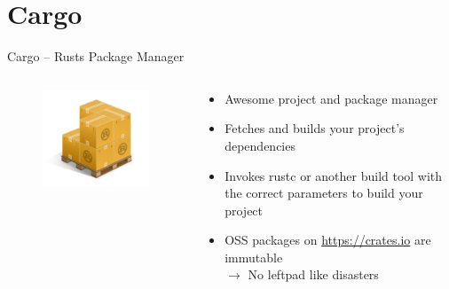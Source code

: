 \documentclass[aspectratio=1610,t]{beamer}
\begin{document}
\section{Cargo}

\begin{frame}[c]{Cargo -- Rusts Package Manager}
  \begin{columns}[onlytextwidth]
    \begin{column}{.3\textwidth}
      \centering
      \begin{figure}
      \includegraphics[width=\textwidth]{./Cargo-Logo-Small.png}
      \end{figure}
    \end{column}
    \begin{column}{.7\textwidth}
      \begin{itemize}
        \item Awesome project and package manager
        \item Fetches and builds your project’s dependencies
        \item Invokes rustc or another build tool with the correct parameters
          to build your project
        \item OSS packages on \url{https://crates.io} are immutable\\ $\rightarrow$
          No leftpad like disasters
      \end{itemize}
    \end{column}
  \end{columns}
\end{frame}
\end{document}
